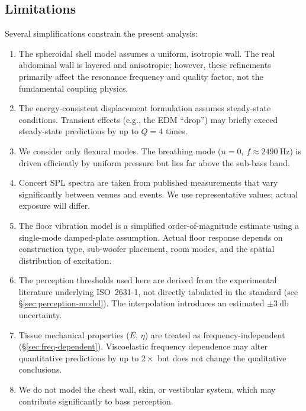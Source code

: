 \subsection{Limitations}
\label{sec:limitations}

Several simplifications constrain the present analysis:
%
\begin{enumerate}
  \item The spheroidal shell model assumes a uniform, isotropic wall.
    The real abdominal wall is layered and anisotropic; however, these
    refinements primarily affect the resonance frequency and quality
    factor, not the fundamental coupling physics.

  \item The energy-consistent displacement formulation assumes
    steady-state conditions.  Transient effects (e.g., the EDM ``drop'')
    may briefly exceed steady-state predictions by up to $Q = 4$ times.

  \item We consider only flexural modes.  The breathing mode
    ($n = 0$, $f \approx \SI{2490}{\hertz}$) is driven efficiently by
    uniform pressure but lies far above the sub-bass band.

  \item Concert SPL spectra are taken from published measurements that
    vary significantly between venues and events.  We use representative
    values; actual exposure will differ.

  \item The floor vibration model is a simplified order-of-magnitude
    estimate using a single-mode damped-plate assumption.  Actual floor
    response depends on construction type, sub-woofer placement, room
    modes, and the spatial distribution of excitation.

  \item The perception thresholds used here are derived from the
    experimental literature underlying ISO~2631-1, not directly
    tabulated in the standard (see \S\ref{sec:perception-model}).  The
    interpolation introduces an estimated $\pm\SI{3}{\decibel}$
    uncertainty.

  \item Tissue mechanical properties ($E$, $\eta$) are treated as
    frequency-independent (\S\ref{sec:freq-dependent}).  Viscoelastic
    frequency dependence may alter quantitative predictions by up to
    $2\times$ but does not change the qualitative conclusions.

  \item We do not model the chest wall, skin, or vestibular system,
    which may contribute significantly to bass perception.
\end{enumerate}
